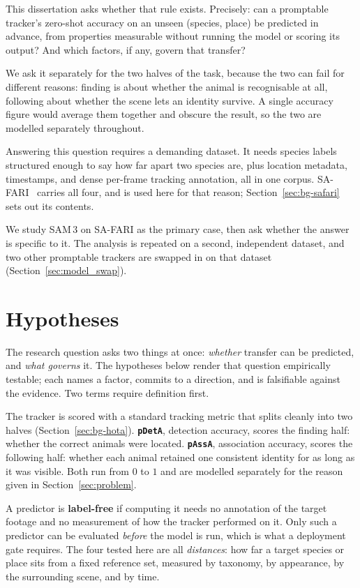 This dissertation asks whether that rule exists. Precisely: can a promptable tracker's zero-shot accuracy on
an unseen (species, place) be predicted in advance, from properties measurable without running the model or
scoring its output? And which factors, if any, govern that transfer?

We ask it separately for the two halves of the task, because the two can fail for different reasons: finding
is about whether the animal is recognisable at all, following about whether the scene lets an identity
survive. A single accuracy figure would average them together and obscure the result, so the two are
modelled separately throughout.

Answering this question requires a demanding dataset. It needs species labels structured enough to say how
far apart two species are, plus location metadata, timestamps, and dense per-frame tracking annotation, all
in one corpus. SA-FARI~\cite{safari} carries all four, and is used here for that reason;
Section~\ref{sec:bg-safari} sets out its contents.

We study SAM\,3 on SA-FARI as the primary case, then ask whether the answer is specific to it. The analysis
is repeated on a second, independent dataset, and two other promptable trackers are swapped in on that
dataset (Section~\ref{sec:model_swap}).

\section{Hypotheses}
\label{sec:hypotheses}
The research question asks two things at once: \emph{whether} transfer can be predicted, and \emph{what
governs} it. The hypotheses below render that question empirically testable; each names a factor, commits
to a direction, and is falsifiable against the evidence. Two terms require definition first.

The tracker is scored with a standard tracking metric that splits cleanly into two halves
(Section~\ref{sec:bg-hota}). \textbf{\texttt{pDetA}}, detection accuracy, scores the finding half: whether
the correct animals were located. \textbf{\texttt{pAssA}}, association accuracy, scores the following half:
whether each animal retained one consistent identity for as long as it was visible. Both run from $0$ to
$1$ and are modelled separately for the reason given in Section~\ref{sec:problem}.

A predictor is \textbf{label-free} if computing it needs no annotation of the target footage and no
measurement of how the tracker performed on it. Only such a predictor can be evaluated \emph{before} the
model is run, which is what a deployment gate requires. The four tested here are all
\emph{distances}: how far a target species or place sits from a fixed reference set, measured by taxonomy, by
appearance, by the surrounding scene, and by time.

